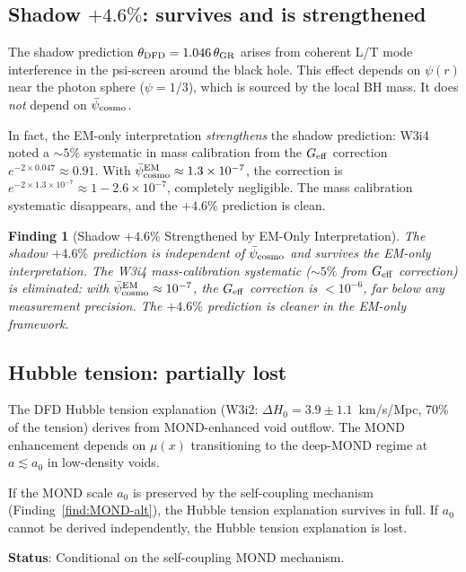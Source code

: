 \documentclass[11pt]{article}
\newtheorem{finding}{Finding}
\newcommand{\ee}[1]{\times 10^{#1}}
\newcommand{\psicosmo}{\bar{\psi}_{\rm cosmo}}
\begin{document}
\subsection{Shadow $+4.6\%$: survives and is strengthened}

The shadow prediction $\theta_{\rm DFD} = 1.046\,\theta_{\rm GR}$
arises from coherent L/T mode interference in the psi-screen around
the black hole. This effect depends on $\psi(r)$ near the photon sphere
($\psi = 1/3$), which is sourced by the local BH mass. It does
\emph{not} depend on $\psicosmo$.

In fact, the EM-only interpretation \emph{strengthens} the shadow
prediction: W3i4 noted a $\sim 5\%$ systematic in mass calibration
from the $G_{\rm eff}$ correction $e^{-2\times 0.047} \approx 0.91$.
With $\psicosmo^{\rm EM} \approx 1.3\ee{-7}$, the correction is
$e^{-2\times 1.3\ee{-7}} \approx 1 - 2.6\ee{-7}$, completely negligible.
The mass calibration systematic disappears, and the $+4.6\%$ prediction
is clean.

\begin{finding}[Shadow $+4.6\%$ Strengthened by EM-Only Interpretation]
\label{find:shadow-strengthened}
The shadow $+4.6\%$ prediction is \emph{independent} of $\psicosmo$ and
survives the EM-only interpretation. The W3i4 mass-calibration systematic
($\sim 5\%$ from $G_{\rm eff}$ correction) is eliminated: with
$\psicosmo^{\rm EM} \approx 10^{-7}$, the $G_{\rm eff}$ correction is
$< 10^{-6}$, far below any measurement precision. The $+4.6\%$ prediction
is cleaner in the EM-only framework.
\end{finding}

\subsection{Hubble tension: partially lost}

The DFD Hubble tension explanation (W3i2: $\Delta H_0 = 3.9 \pm 1.1$~km/s/Mpc,
70\% of the tension) derives from MOND-enhanced void outflow. The MOND
enhancement depends on $\mu(x)$ transitioning to the deep-MOND regime
at $a \lesssim a_0$ in low-density voids.

If the MOND scale $a_0$ is preserved by the self-coupling mechanism
(Finding~\ref{find:MOND-alt}), the Hubble tension explanation survives
in full. If $a_0$ cannot be derived independently, the Hubble tension
explanation is lost.

\textbf{Status}: Conditional on the self-coupling MOND mechanism.
\end{document}
